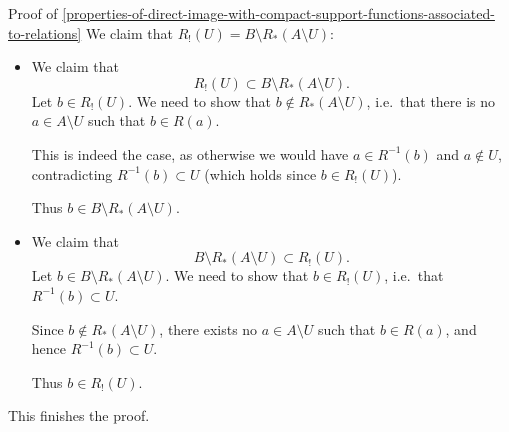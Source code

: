 \begin{Proof}{Proof of \cref{properties-of-direct-image-with-compact-support-functions-associated-to-relations}}
    We claim that $R_{!}(U)=B\setminus R_{*}(A\setminus U)$:
    \begin{itemize}
        \item{}We claim that
            \[
                R_{!}(U)%
                \subset%
                B\setminus R_{*}(A\setminus U).%
            \]%
            Let $b\in R_{!}(U)$. We need to show that $b\nin R_{*}(A\setminus U)$, i.e.\ that there is no $a\in A\setminus U$ such that $b\in R(a)$.

            This is indeed the case, as otherwise we would have $a\in R^{-1}(b)$ and $a\nin U$, contradicting $R^{-1}(b)\subset U$ (which holds since $b\in R_{!}(U)$).

            Thus $b\in B\setminus R_{*}(A\setminus U)$.
        \item{}We claim that
            \[
                B\setminus R_{*}(A\setminus U)%
                \subset%
                R_{!}(U).%
            \]%
            Let $b\in B\setminus R_{*}(A\setminus U)$. We need to show that $b\in R_{!}(U)$, i.e.\ that $R^{-1}(b)\subset U$.

            Since $b\nin R_{*}(A\setminus U)$, there exists no $a\in A\setminus U$ such that $b\in R(a)$, and hence $R^{-1}(b)\subset U$.

            Thus $b\in R_{!}(U)$.
    \end{itemize}
    This finishes the proof.
\end{Proof}
